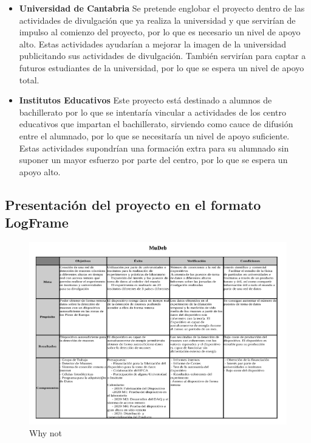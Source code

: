 \documentclass[11pt]{extarticle}
\begin{document}
					\begin{itemize}
						\item \textbf{Universidad de Cantabria} Se pretende englobar el proyecto dentro de las actividades de divulgación que ya realiza la universidad y que servirían de impulso al comienzo del proyecto, por lo que es necesario un nivel de apoyo alto. Estas actividades ayudarían a mejorar la imagen de la universidad publicitando sus actividades de divulgación. También servirían para captar a futuros estudiantes de la universidad, por lo que se espera un nivel de apoyo total.

						\item \textbf{Institutos Educativos} Este proyecto está destinado a alumnos de bachillerato por lo que se intentaría vincular a actividades de los centro educativos que impartan el bachillerato, sirviendo como cauce de difusión entre el alumnado, por lo que se necesitaría un nivel de apoyo suficiente. Estas actividades supondrían una formación extra para su alumnado sin suponer un mayor esfuerzo por parte del centro, por lo que se espera un apoyo alto.
					\end{itemize}

			\subsection{Presentación del proyecto en el formato LogFrame}
				\label{SubSec:PreGeneral:LogFram}

				\begin{figure}[H]
					\centering
					\includegraphics[scale=0.54]{LogFrameMudeb.pdf}
					\caption{\label{Img:widgets}Why not}
				\end{figure}
\end{document}
